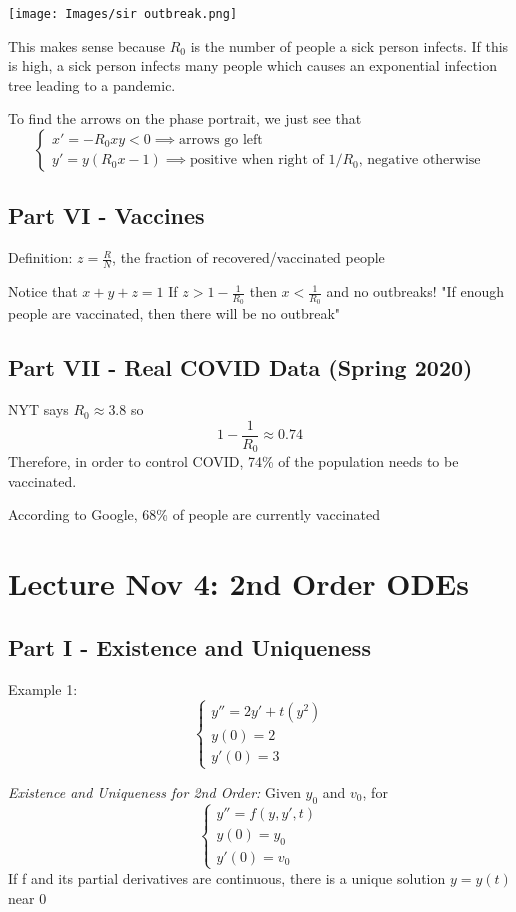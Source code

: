 \documentclass[12pt]{article}
\begin{document}
\texttt{[image: Images/sir outbreak.png]}

This makes sense because $R_0$ is the number of people a sick person infects. If this is high, a sick person infects many people which causes an exponential infection tree leading to a pandemic.

To find the arrows on the phase portrait, we just see that
\[\begin{cases}
    x' = -R_0 xy < 0 \implies  \text{arrows go left}\\
    y' = y(R_0 x - 1) \implies \text{positive when right of $1/R_0$, negative otherwise}
\end{cases}\]

\subsection*{Part VI - Vaccines}
Definition: $z = \frac{R}{N}$,  the fraction of recovered/vaccinated people 

Notice that $x + y + z = 1$ 
If $z > 1 - \frac{1}{R_0}$ then $x < \frac{1}{R_0}$ and no outbreaks!
"If enough people are vaccinated, then there will be no outbreak"

\subsection*{Part VII - Real COVID Data (Spring 2020)}
NYT says $R_0 \approx 3.8$ 
so 
\[1 - \frac{1}{R_0} \approx 0.74\]
Therefore, in order to control COVID, 74\% of the population needs to be vaccinated. 

According to Google, 68\% of people are currently vaccinated

\section{Lecture Nov 4: 2nd Order ODEs}
\subsection*{Part I - Existence and Uniqueness}
Example 1:
\[\begin{cases}
    y'' = 2y' + t(y^2)\\
    y(0) = 2\\
    y'(0) = 3
\end{cases}\]

\emph{Existence and Uniqueness for 2nd Order:} Given $y_0$ and $v_0$, for 
\[\begin{cases}
    y'' = f(y, y', t)\\
    y(0) = y_0\\
    y'(0) = v_0
\end{cases}\]
If f and its partial derivatives are continuous, there is a unique solution $y = y(t)$ near 0
\end{document}
